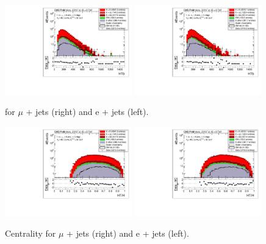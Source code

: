 \begin{figure}[!ht]
    \includegraphics[width=0.49\textwidth]{images/Run1/HTb_SelectedJets_StackLogY_Mu.pdf}
    \includegraphics[width=0.49\textwidth]{images/Run1/HTb_SelectedJets_StackLogY_e.pdf}
    \caption{\HTb for $\mu$ + jets (right) and e + jets (left).}
    \label{fig:HTb}
\end{figure}

\begin{figure}[!ht]
    \includegraphics[width=0.49\textwidth]{images/Run1/HTH_StackLogY_Mu.pdf}
    \includegraphics[width=0.49\textwidth]{images/Run1/HTH_StackLogY_e.pdf}
    \caption{Centrality for $\mu$ + jets (right) and e + jets (left).}
    \label{fig:HTrat}
\end{figure}

